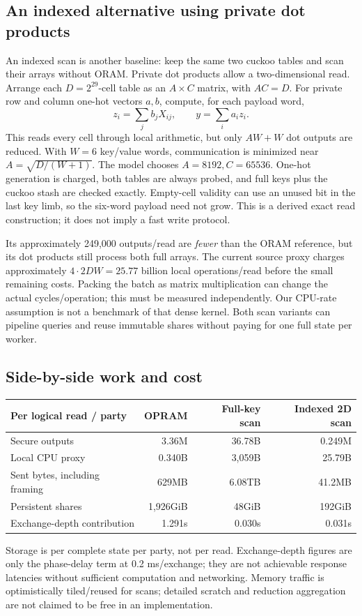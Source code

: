 \subsection{An indexed alternative using private dot products}
An indexed scan is another baseline: keep the same two cuckoo tables
and scan their arrays without ORAM. Private dot products allow a two-dimensional
read. Arrange each $D=2^{29}$-cell table as an $A\times C$ matrix, with $AC=D$.
For private row and column one-hot vectors $a,b$, compute, for each payload word,
\[
 z_i=\sum_j b_jX_{ij},\qquad y=\sum_i a_i z_i.
\]
This reads every cell through local arithmetic, but only $AW+W$ dot outputs are
reduced. With $W=6$ key/value words, communication is minimized near
$A=\sqrt{D/(W+1)}$. The model chooses $A=8192,C=65536$. One-hot generation is charged,
both tables are always probed, and full keys plus the cuckoo stash are checked
exactly. Empty-cell validity can use an unused bit in the last key limb, so the
six-word payload need not grow. This is a derived exact read construction; it
does not imply a fast write protocol.

Its approximately 249,000 outputs/read are \emph{fewer} than the ORAM reference,
but its dot products still process both full arrays. The current source proxy
charges approximately $4\cdot2DW=25.77$ billion local operations/read before the
small remaining costs. Packing the batch as matrix multiplication can change
the actual cycles/operation; this must be measured independently. Our CPU-rate
assumption is not a benchmark of that dense kernel. Both scan variants can pipeline
queries and reuse immutable shares without paying for one full state per worker.

\subsection{Side-by-side work and cost}
\begin{center}\small\begin{tabular}{lrrr}\toprule
Per logical read / party & OPRAM & Full-key scan & Indexed 2D scan\\\midrule
Secure outputs & 3.36M & 36.78B & 0.249M\\
Local CPU proxy & 0.340B & 3,059B & 25.79B\\
Sent bytes, including framing & 629MB & 6.08TB & 41.2MB\\
Persistent shares & 1,926GiB & 48GiB & 192GiB\\
Exchange-depth contribution & 1.291s & 0.030s & 0.031s\\\bottomrule
\end{tabular}\end{center}
Storage is per complete state per party, not per read. Exchange-depth figures
are only the phase-delay term at 0.2 ms/exchange; they are not achievable response
latencies without sufficient computation and networking. Memory traffic is
optimistically tiled/reused for scans; detailed scratch and reduction aggregation
are not claimed to be free in an implementation.

